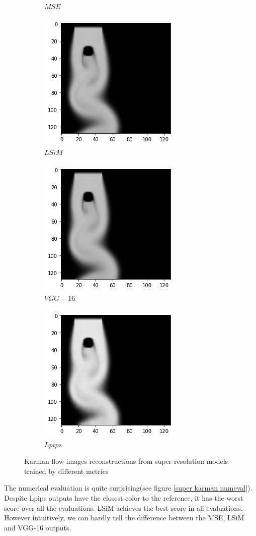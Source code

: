 \documentclass[a4paper,12pt,twoside]{report}
\begin{document}
\begin{figure}
\begin{subfigure}{0.32\textwidth}
		\caption{$MSE$}
	\end{subfigure}
	\begin{subfigure}{0.32\textwidth}
		\centering
		\includegraphics[scale=0.5]{superresolution/karman_lsim.png}
		\caption{$LSiM$}
	\end{subfigure}
	\begin{subfigure}{0.32\textwidth}
		\centering
		\includegraphics[scale=0.5]{superresolution/karman_vgg.png}
		\caption{$VGG-16$}
	\end{subfigure}
	\begin{subfigure}{0.32\textwidth}
		\centering
		\includegraphics[scale=0.5]{superresolution/karman_lpips.png}
		\caption{$Lpips$}
	\end{subfigure}
	\caption{Karman flow images reconstructions from super-resolution models trained by different metrics}
	\label{super karman}
\end{figure}
The numerical evaluation is quite surprising(see figure \ref{super karman numeval}). Despite Lpips outputs have the closest color to the reference, it has the worst score over all the evaluations. LSiM achieves the best score in all evaluations. However intuitively, we can hardly tell the difference between the MSE, LSiM and VGG-16 outputs.
 
\end{document}

